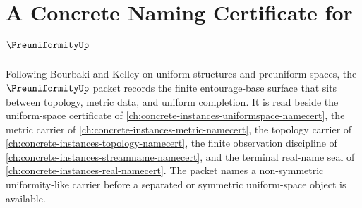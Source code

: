 \chapter{A Concrete Naming Certificate for $\PreuniformityUp$}
\label{ch:concrete-instances-preuniformity-namecert}

Following Bourbaki and Kelley on uniform structures and preuniform spaces, the $\PreuniformityUp$ packet records the finite entourage-base surface that sits between topology, metric data, and uniform completion. It is read beside the uniform-space certificate of \autoref{ch:concrete-instances-uniformspace-namecert}, the metric carrier of \autoref{ch:concrete-instances-metric-namecert}, the topology carrier of \autoref{ch:concrete-instances-topology-namecert}, the finite observation discipline of \autoref{ch:concrete-instances-streamname-namecert}, and the terminal real-name seal of \autoref{ch:concrete-instances-real-namecert}. The packet names a non-symmetric uniformity-like carrier before a separated or symmetric uniform-space object is available.



